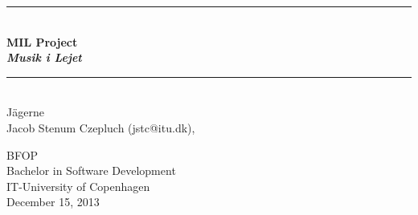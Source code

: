 \documentclass[a4paper,11pt]{article}
\begin{document}
\begin{titlepage}
\centering \parindent=0pt
\newcommand{\HRule}{\rule{\textwidth}{1mm}}
 \HRule\\[1cm]\Huge\bfseries
MIL Project\\\emph{Musik i Lejet}\\[0.7cm]
\HRule\\[4cm]  \large  Jägerne
\\Jacob Stenum Czepluch (jstc@itu.dk), \\

 \normalsize %
\thispagestyle{empty}
\begin{flushleft}
BFOP \\
Bachelor in Software Development\\
IT-University of Copenhagen\\
December 15, 2013 \end{flushleft}
\end{titlepage}

\tableofcontents
\pagebreak

\pagebreak





%

%
\end{document}
